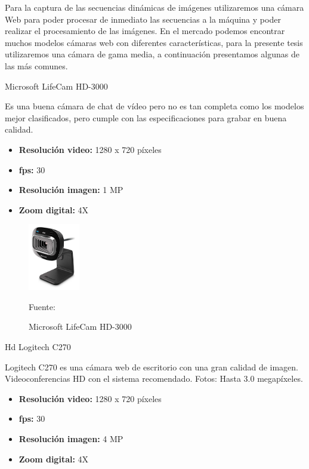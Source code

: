Para la captura de las secuencias dinámicas de imágenes utilizaremos una cámara Web para poder procesar de inmediato las secuencias a la máquina y poder realizar el procesamiento de las imágenes. 
\vskip 0.1cm
En el mercado podemos encontrar muchos modelos cámaras web con diferentes características, para la presente tesis utilizaremos una cámara de gama media, a continuación presentamos algunas de las más comunes.

\begin{enumerate}
{\bf\item[1. ] Microsoft LifeCam HD-3000} \vskip 0.1cm
Es una buena cámara de chat de vídeo pero no es tan completa como los modelos mejor clasificados, pero cumple con las especificaciones para grabar en buena calidad.
\begin{itemize}
\item[•] {\bf Resolución video:}
1280 x 720 píxeles
\item[•] {\bf fps:}
30
\item[•] {\bf Resolución imagen:}
1 MP
\item[•] {\bf Zoom digital:}
4X
\end{itemize}

\begin{figure}[ht]
\begin{center}
\includegraphics[width=0.2\textwidth]{Imagen9}
\end{center}
\begin{center}
\vskip -0.5cm
\caption{\small{Microsoft LifeCam HD-3000}}
{\small{Fuente: \cite{Amazon}}}
\end{center}
\end{figure}

{\bf\item[2. ] Hd Logitech C270} \vskip 0.1cm
Logitech C270 es una cámara web de escritorio con una gran calidad de imagen. Videoconferencias HD con el sistema recomendado. Fotos: Hasta 3.0 megapíxeles.
\begin{itemize}
\item[•] {\bf Resolución video:}
1280 x 720 píxeles
\item[•] {\bf fps:}
30
\item[•] {\bf Resolución imagen:}
4 MP
\item[•] {\bf Zoom digital:}
4X
\end{itemize}


\end{enumerate}
